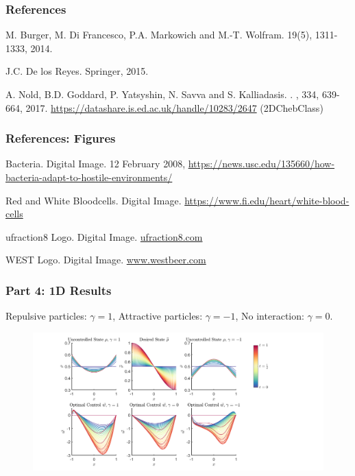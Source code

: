 \documentclass[aspectratio=169,xcolor=dvipsnames]{beamer}
\begin{document}
\begin{frame}
\frametitle{References}    
\begin{thebibliography}{10}    

	M. Burger, M. Di Francesco, P.A. Markowich and  M.-T. Wolfram. 
		 19(5), 1311-1333, 2014. 
	
	J.C. De los Reyes.
	\newblock 	Springer, 2015.
	
	A. Nold, B.D. Goddard, P. Yatsyshin, N. Savva and S. Kalliadasis. 
	.
	, 334, 639-664, 2017.
	\newblock \url{https://datashare.is.ed.ac.uk/handle/10283/2647} (2DChebClass)
\end{thebibliography}
\end{frame}
\begin{frame}
	\frametitle{References: Figures}   
	\begin{thebibliography}{10}    
		
		Bacteria. Digital Image. 12 February 2008, \url{https://news.usc.edu/135660/how-bacteria-adapt-to-hostile-environments/}

		Red and White Bloodcells. Digital Image. \url{https://www.fi.edu/heart/white-blood-cells}

		ufraction8 Logo. Digital Image. 
		\url{ufraction8.com}
		
		WEST Logo. Digital Image.  \url{www.westbeer.com}
	\end{thebibliography}	
\end{frame}
\begin{frame}
	\frametitle{Part 4: 1D Results}
	Repulsive particles: $\gamma = 1$, Attractive particles: $\gamma = -1$, No interaction: $\gamma =0$.
	\begin{figure}
		\includegraphics[width=15cm]{Figure4.png}
	\end{figure}
\end{frame}
\end{document}
